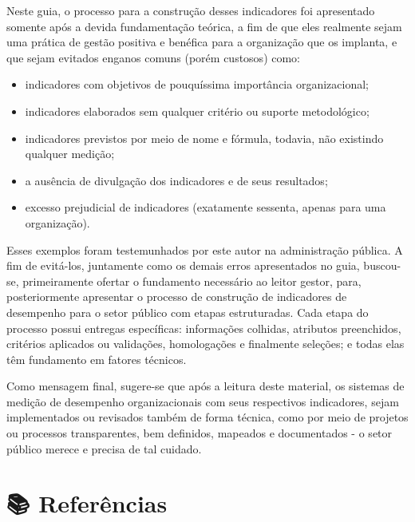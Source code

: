 \documentclass[
  letterpaper,
  DIV=11,
  numbers=noendperiod]{scrreprt}
\begin{document}
Neste guia, o processo para a construção desses indicadores foi
apresentado somente após a devida fundamentação teórica, a fim de que
eles realmente sejam uma prática de gestão positiva e benéfica para a
organização que os implanta, e que sejam evitados enganos comuns (porém
custosos) como:

\begin{itemize}
\item
  indicadores com objetivos de pouquíssima importância organizacional;
\item
  indicadores elaborados sem qualquer critério ou suporte metodológico;
\item
  indicadores previstos por meio de nome e fórmula, todavia, não
  existindo qualquer medição;
\item
  a ausência de divulgação dos indicadores e de seus resultados;
\item
  excesso prejudicial de indicadores (exatamente sessenta, apenas para
  uma organização).
\end{itemize}

Esses exemplos foram testemunhados por este autor na administração
pública. A fim de evitá-los, juntamente como os demais erros
apresentados no guia, buscou-se, primeiramente ofertar o fundamento
necessário ao leitor gestor, para, posteriormente apresentar o processo
de construção de indicadores de desempenho para o setor público com
etapas estruturadas. Cada etapa do processo possui entregas específicas:
informações colhidas, atributos preenchidos, critérios aplicados ou
validações, homologações e finalmente seleções; e todas elas têm
fundamento em fatores técnicos.

Como mensagem final, sugere-se que após a leitura deste material, os
sistemas de medição de desempenho organizacionais com seus respectivos
indicadores, sejam implementados ou revisados também de forma técnica,
como por meio de projetos ou processos transparentes, bem definidos,
mapeados e documentados - o setor público merece e precisa de tal
cuidado.


\hypertarget{referuxeancias}{%
\chapter*{📚 Referências}\label{referuxeancias}}

\end{document}
